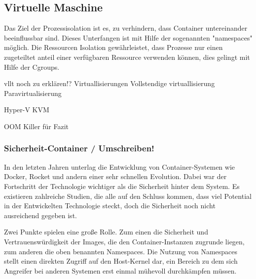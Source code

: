 \subsection{Virtuelle Maschine}
Das Ziel der Prozessisolation ist es, zu verhindern, dass Container untereinander beeinflussbar sind. Dieses Unterfangen ist mit Hilfe der sogenannten "namespaces" möglich. Die Ressourcen Isolation gewährleistet, dass Prozesse nur einen zugeteiltet anteil einer verfügbaren Ressource verwenden können, dies gelingt mit Hilfe der Cgroups.


vllt noch zu erklären!?
Virtuallisierungen
Vollstendige virtuallisierung 
Paravirtualisierung

Hyper-V
KVM

OOM Killer für Fazit


\subsubsection{Sicherheit-Container / Umschreiben!}
In den letzten Jahren unterlag die Entwicklung von Container-Systemen wie Docker, Rocket und andern einer sehr schnellen Evolution. Dabei war der Fortschritt der Technologie wichtiger als die Sicherheit hinter dem System. Es existieren zahlreiche Studien, die alle auf den Schluss kommen, dass viel Potential in der Entwickelten Technologie steckt, doch die Sicherheit noch nicht ausreichend gegeben ist.

Zwei Punkte spielen eine große Rolle. Zum einen die Sicherheit und Vertrauenswürdigkeit der Images, die den Container-Instanzen zugrunde liegen, zum anderen die oben benannten Namespaces. Die Nutzung von Namespaces stellt einen direkten Zugriff auf den Host-Kernel dar, ein Bereich zu dem sich Angreifer bei anderen Systemen erst einmal mühevoll durchkämpfen müssen.